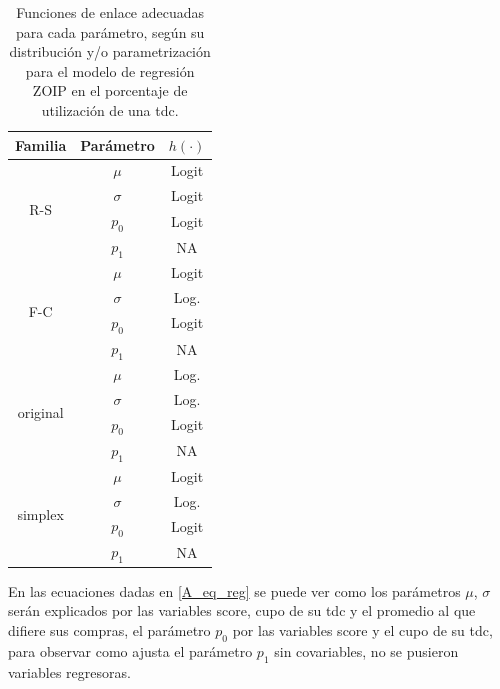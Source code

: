 \begin{table}[!hbt]
{\scriptsize
\begin{center}
\begin{tabular}{|c|c|c|}\hline
Familia & Par\'{a}metro & $h(\cdot)$ \\ \hline
\multirow{4}{*}{R-S} & $\mu$ & Logit \\
 & $\sigma$ & Logit \\
 & $p_0$ & Logit \\
 & $p_1$ & NA \\ \hline

\multirow{4}{*}{F-C} & $\mu$ & Logit \\
 & $\sigma$ & Log. \\
 & $p_0$ & Logit \\
 & $p_1$ & NA \\ \hline

\multirow{4}{*}{original} & $\mu$ & Log. \\
 & $\sigma$ & Log. \\
 & $p_0$ & Logit \\
 & $p_1$ & NA \\ \hline

\multirow{4}{*}{simplex} & $\mu$ & Logit \\
 & $\sigma$ & Log. \\
 & $p_0$ & Logit \\
 & $p_1$ & NA \\ \hline

\end{tabular}
\caption{Funciones de enlace adecuadas para cada par\'{a}metro, seg\'{u}n su distribuci\'{o}n y/o parametrizaci\'{o}n para el modelo de regresi\'{o}n ZOIP en el porcentaje de utilizaci\'{o}n de una tdc.}
\label{T_F_enlace2}
\end{center}
}
\end{table}

En las ecuaciones dadas en \eqref{A_eq_reg} se puede ver como los par\'{a}metros $\mu$, $\sigma$ ser\'{a}n explicados por las variables score, cupo de su tdc y el promedio al que difiere sus compras, el par\'{a}metro $p_0$ por las variables score y el cupo de su tdc, para observar como ajusta el par\'{a}metro $p_1$ sin covariables, no se pusieron variables regresoras.


